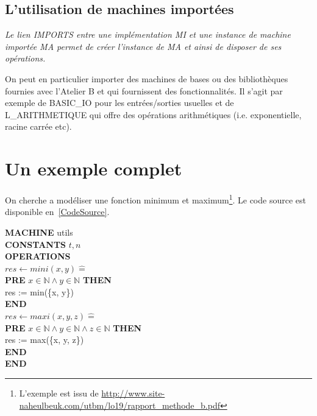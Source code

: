 \documentclass[10pt,a4paper]{article}
\newcommand{\Bequal}{\mathrel{\widehat{=}}}
\begin{document}
\subsection{L'utilisation de machines importées}

\emph{Le lien IMPORTS entre une implémentation MI et une instance de machine importée MA permet de créer l'instance de MA et ainsi de disposer de ses opérations.\cite{habrias2006specifications}}

On peut en particulier importer des machines de bases ou des bibliothèques fournies avec l'Atelier B et qui fournissent des fonctionnalités. Il s'agit par exemple de BASIC\_IO pour les entrées/sorties usuelles et de L\_ARITHMETIQUE qui offre des opérations arithmétiques (i.e. exponentielle, racine carrée etc).

\section{Un exemple complet}
\label{ExempleComplet}
On cherche a modéliser une fonction minimum et maximum\footnote{L'exemple est issu de \url{http://www.site-naheulbeuk.com/utbm/lo19/rapport_methode_b.pdf}}.
Le code source est disponible en~\cref{CodeSource}.

\noindent \textbf{MACHINE} utils \\
\textbf{CONSTANTS} $t,n$ \\
\textbf{OPERATIONS} \\
$res \leftarrow mini(x, y) \Bequal$ \\
\hspace*{1em}  \textbf{PRE} $x \in \mathbb{N} \wedge  y \in \mathbb{N} $ \textbf{THEN} \\
\hspace*{2em} res := min(\{x, y\})  \\
\hspace*{1em} \textbf{END} \\
$res \leftarrow maxi(x, y, z) \Bequal$ \\
\hspace*{1em}  \textbf{PRE} $x \in \mathbb{N} \wedge  y \in \mathbb{N} \wedge z \in \mathbb{N}$ \textbf{THEN} \\
\hspace*{2em} res := max(\{x, y, z\})  \\
\hspace*{1em} \textbf{END} \\
\textbf{END}
\end{document}

